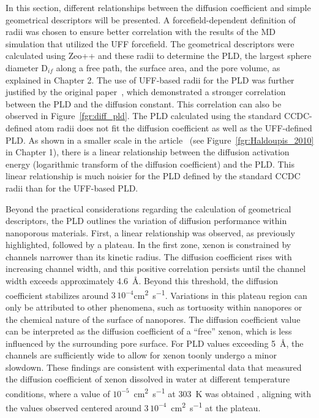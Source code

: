 \documentclass[main]{subfiles}
\begin{document}
In this section, different relationships between the diffusion coefficient and simple geometrical descriptors will be presented. A forcefield-dependent definition of radii was chosen to ensure better correlation with the results of the MD simulation that utilized the UFF forcefield. The geometrical descriptors were calculated using Zeo++ and these radii to determine the PLD, the largest sphere diameter D$_{if}$ along a free path, the surface area, and the pore volume, as explained in Chapter 2. The use of UFF-based radii for the PLD was further justified by the original paper~\cite{Hung_2021}, which demonstrated a stronger correlation between the PLD and the diffusion constant. This correlation can also be observed in Figure~\ref{fgr:diff_pld}. The PLD calculated using the standard CCDC-defined atom radii does not fit the diffusion coefficient as well as the UFF-defined PLD. As shown in a smaller scale in the article~\cite{Haldoupis_2010} (see Figure~\ref{fgr:Haldoupis_2010} in Chapter 1), there is a linear relationship between the diffusion activation energy (logarithmic transform of the diffusion coefficient) and the PLD. This linear relationship is much noisier for the PLD defined by the standard CCDC radii than for the UFF-based PLD.

Beyond the practical considerations regarding the calculation of geometrical descriptors, the PLD outlines the variation of diffusion performance within nanoporous materials. First, a linear relationship was observed, as previously highlighted, followed by a plateau. In the first zone, xenon is constrained by channels narrower than its kinetic radius. The diffusion coefficient rises with increasing channel width, and this positive correlation persists until the channel width exceeds approximately \SI{4.6}{\angstrom}. Beyond this threshold, the diffusion coefficient stabilizes around $3\,10^{-4}$\si{\square\cm\per\s}. Variations in this plateau region can only be attributed to other phenomena, such as tortuosity within nanopores or the chemical nature of the surface of nanopores. The diffusion coefficient value can be interpreted as the diffusion coefficient of a ``free'' xenon, which is less influenced by the surrounding pore surface. For PLD values exceeding \SI{5}{\angstrom}, the channels are sufficiently wide to allow for xenon toonly undergo a minor slowdown. These findings are consistent with experimental data that measured the diffusion coefficient of xenon dissolved in water at different temperature conditions, where a value of $10^{-5}$~\si{\square\cm\per\s} at \SI{303}{\kelvin} was obtained \autocite{Wise1968}, aligning with the values observed centered around $3\,10^{-4}$~\si{\square\cm\per\s} at the plateau.
\end{document}
